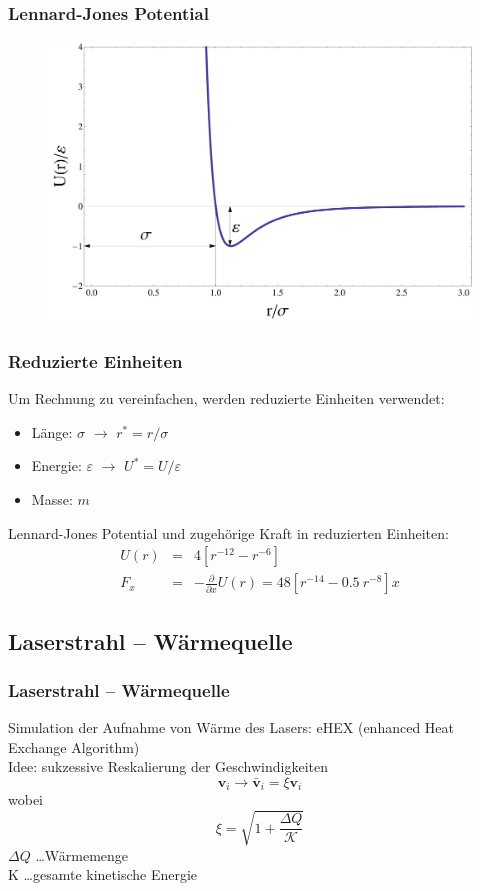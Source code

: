 \documentclass{beamer}
\begin{document}
\begin{frame}
\frametitle{Lennard-Jones Potential}
\begin{center}
\begin{figure}
\includegraphics[scale=0.3]{../images/LJ-2.pdf}
\end{figure}
\end{center}
\end{frame}

\begin{frame}
\frametitle{Reduzierte Einheiten}
Um Rechnung zu vereinfachen, werden reduzierte Einheiten verwendet:
\begin{itemize}
\item Länge: $\sigma$ $\rightarrow$ $r^* = r/\sigma$
\item Energie: $\varepsilon$ $\rightarrow$ $U^* = U/\varepsilon$
\item Masse: $m$
\end{itemize}
Lennard-Jones Potential und zugehörige Kraft in reduzierten Einheiten:
\begin{eqnarray}
    U(r) &=& 4\left[{r}^{-12} - {r}^{-6}\right] \\
    F_{x} &=& -\frac{\partial}{\partial x} U(r) = 48 \left[r^{-14} - 0.5 \ r^{-8}\right] x
\end{eqnarray}
\end{frame}



\subsection{Laserstrahl -- Wärmequelle}
\begin{frame}
\frametitle{Laserstrahl -- Wärmequelle}
Simulation der Aufnahme von Wärme des Lasers: eHEX (enhanced Heat Exchange Algorithm)\\
Idee: sukzessive Reskalierung der Geschwindigkeiten 
\begin{equation}
    \mathbf{v}_i \rightarrow \mathbf{\bar{v}}_i = \xi \mathbf{v}_i
\end{equation}
wobei 
\begin{equation}
    \xi = \sqrt{1+\frac{\Delta Q}{\mathcal{K}}}
\end{equation}
$\Delta Q$ \ldots Wärmemenge\\
K \ldots gesamte kinetische Energie

\end{frame}
\end{document}
